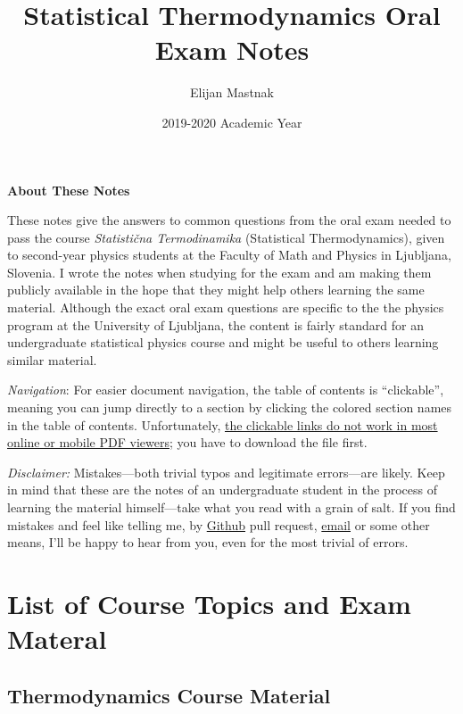\documentclass[11pt, a4paper]{article}
\begin{document}
\vspace{-10mm}
\title{Statistical Thermodynamics Oral Exam Notes}
\author{Elijan Mastnak}
\date{2019-2020 Academic Year}
\maketitle

\begin{center}
\textbf{About These Notes}
\end{center}
These notes give the answers to common questions from the oral exam needed to pass the course \textit{Statisti\v{c}na Termodinamika} (Statistical Thermodynamics), given to second-year physics students at the Faculty of Math and Physics in Ljubljana, Slovenia. I wrote the notes when studying for the exam and am making them publicly available in the hope that they might help others learning the same material. Although the exact oral exam questions are specific to the the physics program at the University of Ljubljana, the content is fairly standard for an undergraduate statistical physics course and might be useful to others learning similar material.

\vspace{2mm}
\textit{Navigation}: For easier document navigation, the table of contents is ``clickable'', meaning you can jump directly to a section by clicking the colored section names in the table of contents. Unfortunately, \uline{the clickable links do not work in most online or mobile PDF viewers}; you have to download the file first.

\vspace{2mm}
\textit{Disclaimer:} Mistakes---both trivial typos and legitimate errors---are likely. Keep in mind that these are the notes of an undergraduate student in the process of learning the material himself---take what you read with a grain of salt. If you find mistakes and feel like telling me, by \href{https://github.com/ejmastnak/fmf}{Github} pull request, \href{mailto:ejmastnak@gmail.com}{email} or some other means, I'll be happy to hear from you, even for the most trivial of errors.


\tableofcontents	


\iffalse
\section{List of Course Topics and Exam Materal}
\subsection{Thermodynamics Course Material}
\end{document}

